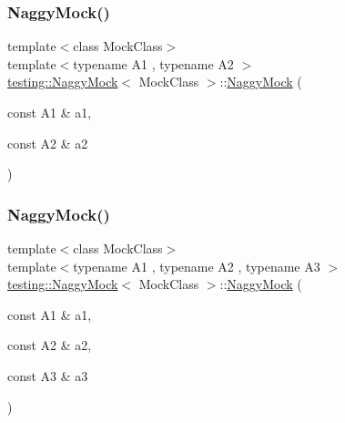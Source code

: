 \subsubsection{\texorpdfstring{NaggyMock()}{NaggyMock()}\hspace{0.1cm}{\footnotesize\ttfamily [3/11]}}
{\footnotesize\ttfamily template$<$class Mock\+Class$>$ \\
template$<$typename A1 , typename A2 $>$ \\
\mbox{\hyperlink{classtesting_1_1NaggyMock}{testing\+::\+Naggy\+Mock}}$<$ Mock\+Class $>$\+::\mbox{\hyperlink{classtesting_1_1NaggyMock}{Naggy\+Mock}} (\begin{DoxyParamCaption}\item[{const A1 \&}]{a1,  }\item[{const A2 \&}]{a2 }\end{DoxyParamCaption})\hspace{0.3cm}{\ttfamily [inline]}}

\mbox{\label{classtesting_1_1NaggyMock_abd9eea0573bf39f4b41504b2d1df5311}} 
\subsubsection{\texorpdfstring{NaggyMock()}{NaggyMock()}\hspace{0.1cm}{\footnotesize\ttfamily [4/11]}}
{\footnotesize\ttfamily template$<$class Mock\+Class$>$ \\
template$<$typename A1 , typename A2 , typename A3 $>$ \\
\mbox{\hyperlink{classtesting_1_1NaggyMock}{testing\+::\+Naggy\+Mock}}$<$ Mock\+Class $>$\+::\mbox{\hyperlink{classtesting_1_1NaggyMock}{Naggy\+Mock}} (\begin{DoxyParamCaption}\item[{const A1 \&}]{a1,  }\item[{const A2 \&}]{a2,  }\item[{const A3 \&}]{a3 }\end{DoxyParamCaption})\hspace{0.3cm}{\ttfamily [inline]}}

\mbox{\label{classtesting_1_1NaggyMock_aa7d63f62600171db931c6bbb4c2a6d52}} 
